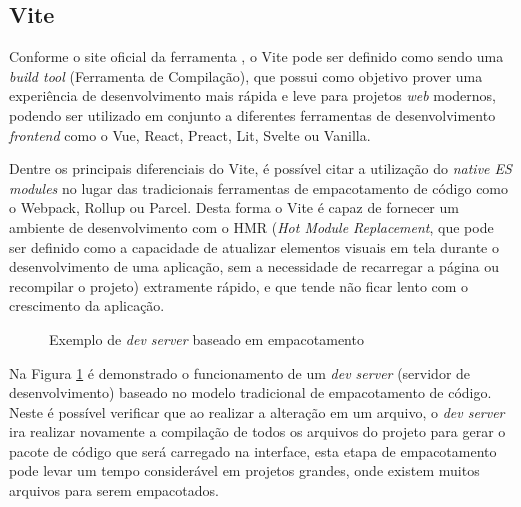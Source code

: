 \subsection{Vite}

Conforme o site oficial da ferramenta \cite{Vite:2022}, o Vite pode ser definido
como sendo uma \emph{build tool} (Ferramenta de Compilação), que possui como objetivo
prover uma experiência de desenvolvimento mais rápida e leve para projetos
\emph{web} modernos, podendo ser utilizado em conjunto a diferentes ferramentas de
desenvolvimento \emph{frontend} como o Vue, React, Preact, Lit, Svelte ou Vanilla.

Dentre os principais diferenciais do Vite, é possível citar a utilização do
\emph{native ES modules} no lugar das tradicionais ferramentas de empacotamento
de código como o Webpack, Rollup ou Parcel. Desta forma o Vite é capaz de
fornecer um ambiente de desenvolvimento com o HMR (\emph{Hot Module Replacement},
que pode ser definido como a capacidade de atualizar elementos visuais em tela
durante o desenvolvimento de uma aplicação, sem a necessidade de recarregar a
página ou recompilar o projeto) extramente rápido, e que tende não ficar lento
com o crescimento da aplicação.

\begin{figure}[H]
    \caption{Exemplo de \emph{dev server} baseado em empacotamento}
    \centering
    \label{fig:bundle-based}
\end{figure}

Na Figura \ref{fig:bundle-based} é demonstrado o funcionamento de um \emph{dev server}
(servidor de desenvolvimento) baseado no modelo tradicional de empacotamento de código.
Neste é possível verificar que ao realizar a alteração em um arquivo, o \emph{dev server}
ira realizar novamente a compilação de todos os arquivos do projeto para gerar o pacote
de código que será carregado na interface, esta etapa de empacotamento pode levar um tempo
considerável em projetos grandes, onde existem muitos arquivos para serem empacotados.

